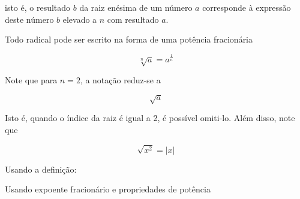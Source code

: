     \noindent   
	isto é, o resultado $b$ da raiz enésima de um número $a$ corresponde à expressão deste número $b$ elevado a $n$ com resultado $a$.
    
	Todo radical pode ser escrito na forma de uma potência fracionária
	
	\[
		\sqrt[n]{a} = a^{\frac{1}{n}}
	\]
	
	Note que para $n = 2$, a notação reduz-se a
	
	\[
		\sqrt{a}
	\]
	
	Isto é, quando o índice da raiz é igual a 2, é possível omiti-lo. Além disso, note que
	
	\[
		\sqrt{x^2} = | x |
	\]
	
	Usando a definição:

        \begin{texample}
        \centering
        \end{texample}
	
	Usando expoente fracionário e propriedades de potência
	\begin{texample}
        \centering
        \end{texample}
	
